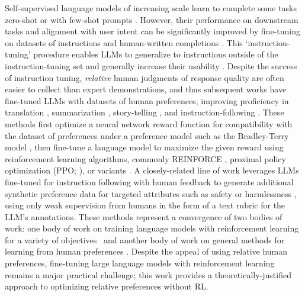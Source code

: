 Self-supervised language models of increasing scale learn to complete some tasks zero-shot \citep{radford2019language} or with few-shot prompts \citep{gpt3,megatron,chowdhery2022palm}. However, their performance on downstream tasks and alignment with user intent can be significantly improved by fine-tuning on datasets of instructions and human-written completions \citep{mishra-etal-2022-cross,sanh2022multitask,chung2022scaling,thoppilan2022lamda}. This `instruction-tuning' procedure
enables LLMs to generalize to instructions outside of the instruction-tuning set and generally increase their usability \citep{chung2022scaling}. Despite the success of instruction tuning, \textit{relative} human judgments of response quality are often easier to collect than expert demonstrations, and thus subsequent works have fine-tuned LLMs with datasets of human preferences, improving proficiency in translation \citep{kreutzer-etal-2018-reliability}, summarization \citep{stiennon2022learning,ziegler2020finetuning}, story-telling \citep{ziegler2020finetuning}, and instruction-following \citep{ouyang2022training,ramamurthy2023is}. These methods first optimize a neural network reward function for compatibility with the dataset of preferences under a preference model such as the Bradley-Terry model \citep{bradley1952rankanalysis}, then fine-tune a language model to maximize the given reward using reinforcement learning algorithms, commonly REINFORCE \citep{williams1992reinforce}, proximal policy optimization (PPO; \cite{schulman2017proximal}), or variants \citep{ramamurthy2023is}. A closely-related line of work leverages LLMs fine-tuned for instruction following with human feedback to generate additional synthetic preference data for targeted attributes such as safety or harmlessness \citep{bai2022constitutional}, using only weak supervision from humans in the form of a text rubric for the LLM's annotations. These methods represent a convergence of two bodies of work: one body of work on training language models with reinforcement learning for a variety of objectives~\citep{Ranzato2015SequenceLT,paulus2018a,wu2018learning} and another body of work on general methods for learning from human preferences \citep{christiano2017deep,kupcsik2018learning}. 
Despite the appeal of using relative human preferences, fine-tuning large language models with reinforcement learning remains a major practical challenge; this work provides a theoretically-justified approach to optimizing relative preferences without RL.

